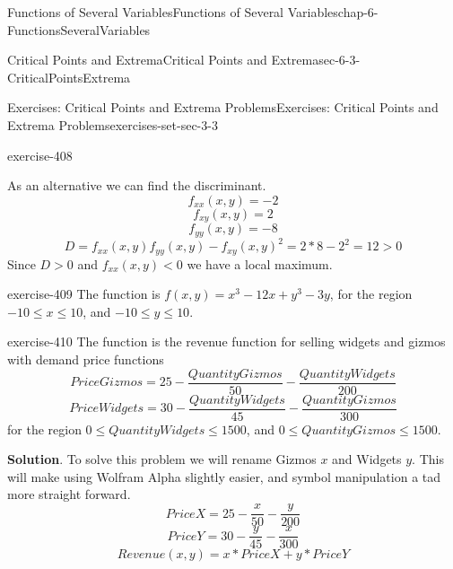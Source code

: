 \documentclass[oneside,10pt,]{book}
\numberwithin{equation}{section}
\newcommand{\lt}{<}
\newcommand{\gt}{>}
\begin{document}
\begin{chapterptx}{Functions of Several Variables}{}{Functions of Several Variables}{}{}{chap-6-FunctionsSeveralVariables}
\begin{sectionptx}{Critical Points and Extrema}{}{Critical Points and Extrema}{}{}{sec-6-3-CriticalPointsExtrema}
\begin{exercises-subsection-numberless}{Exercises: Critical Points and Extrema Problems}{}{Exercises: Critical Points and Extrema Problems}{}{}{exercises-set-sec-3-3}
\begin{divisionexercise}{3}{}{}{exercise-408}
\begin{itemize}[label=\textbullet]
\par
\hypertarget{p-2408}{}%
As an alternative we can find the discriminant.%
%
\begin{equation*}
f_{xx}  (x,y)=-2
\end{equation*}
%
\begin{equation*}
f_{xy}  (x,y)=2
\end{equation*}
%
\begin{equation*}
f_{yy}  (x,y)=-8
\end{equation*}
%
\begin{equation*}
D=f_{xx}  (x,y)f_{yy}  (x,y)-f_{xy}  (x,y)^2=2*8-2^2=12\gt 0
\end{equation*}
\hypertarget{p-2409}{}%
Since \(D\gt 0\) and \(f_{xx}  (x,y)\lt 0\) we have a local maximum.%
\end{itemize}
\end{divisionexercise}%
\begin{divisionexercise}{4}{}{}{exercise-409}%
\hypertarget{p-2410}{}%
The function is \(f(x,y)=x^3-12x+y^3-3y\), for the region \(-10\le x\le 10\), and \(-10\le y\le 10\).%
\end{divisionexercise}%
\begin{divisionexercise}{5}{}{}{exercise-410}%
\hypertarget{p-2411}{}%
The function is the revenue function for selling widgets and gizmos with demand price functions%
%
\begin{equation*}
PriceGizmos=25-\frac{QuantityGizmos}{50}-\frac{QuantityWidgets}{200}
\end{equation*}
%
\begin{equation*}
PriceWidgets=30-\frac{QuantityWidgets}{45}-\frac{QuantityGizmos}{300}
\end{equation*}
\hypertarget{p-2412}{}%
for the region \(0\le QuantityWidgets\le 1500\), and \(0\le QuantityGizmos\le 1500\).%
\par\smallskip%
\noindent\textbf{Solution}.\hypertarget{solution-207}{}\quad%
\hypertarget{p-2413}{}%
To solve this problem we will rename Gizmos \(x\) and Widgets \(y\). This will make using Wolfram Alpha slightly easier, and symbol manipulation a tad more straight forward.%
%
\begin{equation*}
PriceX=25-\frac{x}{50}-\frac{y}{200}
\end{equation*}
%
\begin{equation*}
PriceY=30-\frac{y}{45}-\frac{x}{300}
\end{equation*}
%
\begin{equation*}
Revenue (x,y)=x*PriceX+y *PriceY
\end{equation*}

\end{divisionexercise}
\end{exercises-subsection-numberless}
\end{sectionptx}
\end{chapterptx}
\end{document}
